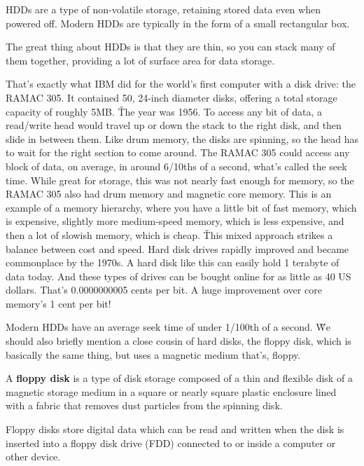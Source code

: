HDDs are a type of non-volatile storage, retaining stored data even when powered off. Modern HDDs are typically in
the form of a small rectangular box.


The great thing about HDDs is that they are thin, so you can stack many of them together, providing a lot of surface
area for data storage.

\be
That's exactly what IBM did for the world's first computer with a disk drive: the RAMAC 305. It contained 50, 24-inch
diameter disks, offering a total storage capacity of roughly 5MB. \v

The year was 1956. To access any bit of data, a read/write head would travel up or down the stack to the right disk,
and then slide in between them. Like drum memory, the disks are spinning, so the head has to wait for the right
section to come around. The RAMAC 305 could access any block of data,  on average, in around 6/10ths of a second,
what's called the seek time. While great for storage, this was not nearly fast enough for memory, so the RAMAC 305
also had drum memory and magnetic core memory. This is an example of a memory hierarchy, where you have a little bit
of fast memory, which is expensive, slightly more medium-speed memory, which is less expensive, and then a lot of
slowish memory, which is cheap. \v

This mixed approach strikes a balance between cost and speed. Hard disk drives rapidly improved and became
commonplace by the 1970s. A hard disk like this can easily hold 1 terabyte of data today. And these types of drives
can be bought online for as little as 40 US dollars. That's 0.0000000005 cents per bit. A huge improvement over core
memory's 1 cent per bit!
\ee

Modern HDDs have an average seek time of under 1/100th of a second. \v

We should also briefly mention a close cousin of hard disks, the floppy disk, which is basically the same thing, but
uses a magnetic medium that's, floppy.

A \textbf{floppy disk} is a type of disk storage composed of a thin and flexible disk of a magnetic storage medium in
a square or nearly square plastic enclosure lined with a fabric that removes dust particles from the spinning disk.
\ed

Floppy disks store digital data which can be read and written when the disk is inserted into a floppy disk drive
(FDD) connected to or inside a computer or other device.

